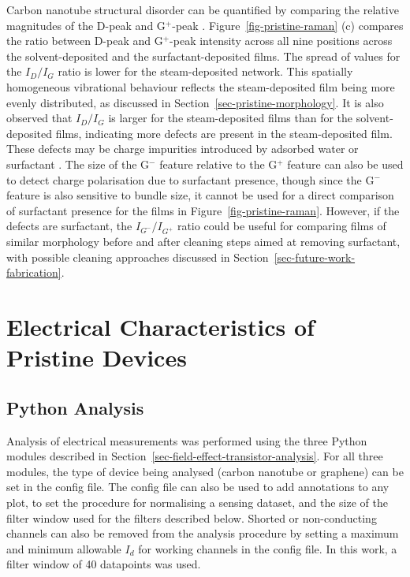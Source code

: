 \documentclass[
  a4paper,
]{scrbook}
\begin{document}
Carbon nanotube structural disorder can be quantified by comparing the
relative magnitudes of the D-peak and G\(^+\)-peak
\autocite{Dresselhaus2005,King2014}. Figure~\ref{fig-pristine-raman} (c)
compares the ratio between D-peak and G\(^+\)-peak intensity across all
nine positions across the solvent-deposited and the surfactant-deposited
films. The spread of values for the \(I_D/I_G\) ratio is lower for the
steam-deposited network. This spatially homogeneous vibrational
behaviour reflects the steam-deposited film being more evenly
distributed, as discussed in Section~\ref{sec-pristine-morphology}. It
is also observed that \(I_D/I_G\) is larger for the steam-deposited
films than for the solvent-deposited films, indicating more defects are
present in the steam-deposited film. These defects may be charge
impurities introduced by adsorbed water or surfactant
\autocite{Christensen2022}. The size of the G\(^-\) feature relative to
the G\(^+\) feature can also be used to detect charge polarisation due
to surfactant presence, though since the G\(^-\) feature is also
sensitive to bundle size, it cannot be used for a direct comparison of
surfactant presence for the films in Figure~\ref{fig-pristine-raman}.
However, if the defects are surfactant, the \(I_{G^-}/I_{G^+}\) ratio
could be useful for comparing films of similar morphology before and
after cleaning steps aimed at removing surfactant, with possible
cleaning approaches discussed in
Section~\ref{sec-future-work-fabrication}.

\hypertarget{sec-pristine-electrical-characterisation}{%
\section{Electrical Characteristics of Pristine
Devices}\label{sec-pristine-electrical-characterisation}}

\hypertarget{sec-python-analysis}{%
\subsection{Python Analysis}\label{sec-python-analysis}}

Analysis of electrical measurements was performed using the three Python
modules described in Section~\ref{sec-field-effect-transistor-analysis}.
For all three modules, the type of device being analysed (carbon
nanotube or graphene) can be set in the config file. The config file can
also be used to add annotations to any plot, to set the procedure for
normalising a sensing dataset, and the size of the filter window used
for the filters described below. Shorted or non-conducting channels can
also be removed from the analysis procedure by setting a maximum and
minimum allowable \(I_d\) for working channels in the config file. In
this work, a filter window of 40 datapoints was used.
\end{document}
